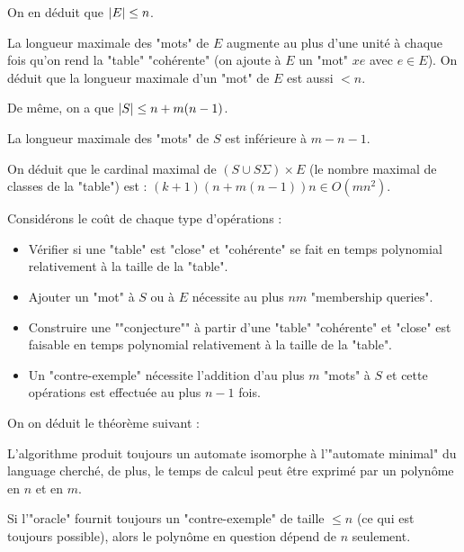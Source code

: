 On en déduit que $\left|E\right| \leq n$.

La longueur maximale des "mots" de $E$ augmente au plus d'une unité à chaque fois qu'on rend la "table" "cohérente"
(on ajoute à $E$ un "mot" $xe$ avec $e \in E$). On déduit que la longueur maximale d'un "mot" de $E$ est aussi $<n$.

De même, on a que  $\left|S\right| \leq n + m(n-1)$. %

La longueur maximale des "mots" de $S$ est inférieure à $m - n -1$.


On déduit que le cardinal maximal de $(S \cup S \Sigma) \times E$ (le nombre maximal de classes de la "table") est : $(k+1)(n+m(n-1))n \in O(mn^2)$.


Considérons le coût de chaque type d'opérations :
\begin{itemize}
	\item Vérifier si une "table" est "close" et "cohérente" se fait en temps polynomial relativement à la taille de la "table".
	\item Ajouter un "mot" à $S$ ou à $E$ nécessite au plus $nm$ "membership queries".
	\item Construire une ""conjecture"" à partir d'une "table" "cohérente" et "close" est faisable en temps polynomial relativement à
	      la taille de la "table".
	\item Un "contre-exemple" nécessite l'addition d'au plus $m$ "mots" à $S$ et cette opérations est effectuée au plus $n-1$ fois.
\end{itemize}

\vspace{0.5cm}

On on déduit le théorème suivant :

\begin{theorem}
	L'algorithme produit toujours un automate isomorphe à l'"automate minimal" du language cherché, de plus, le temps de calcul peut être
	exprimé par un polynôme en $n$ et en $m$.
\end{theorem}

\begin{remarque}
	Si l'"oracle" fournit toujours un "contre-exemple" de taille $\leq n$ (ce qui est toujours possible), alors le polynôme en question dépend de $n$ seulement.
\end{remarque}

